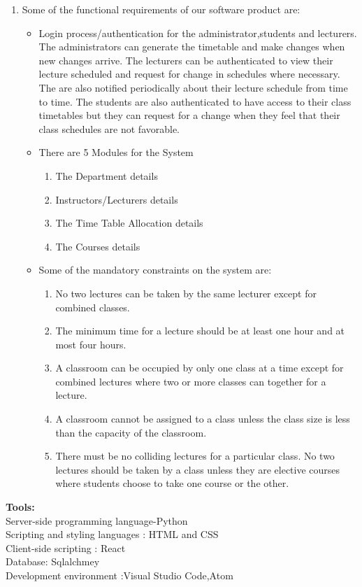 \documentclass{scrreprt}
\begin{document}
\begin{enumerate}
\item Some of the functional requirements of our software product are:
\begin{itemize}
\item Login process/authentication for the administrator,students and lecturers. The administrators can generate the timetable and  make changes when new changes arrive. The lecturers can be authenticated to view their lecture scheduled and request for change in schedules where necessary. The are also notified periodically about their lecture schedule from time to time. The students are also authenticated to have access to their class timetables but they can request for a change when they feel that their class schedules are not favorable.
\item There are 5 Modules for the System
\begin{enumerate}
\item The  Department details 
\item Instructors/Lecturers details
\item The Time Table Allocation details
\item The Courses details
\end{enumerate}
\item Some of the mandatory constraints on the system are:
\begin {enumerate}
\item No two lectures can be taken by the same lecturer except for combined classes.
\item The minimum time for a lecture should be at least one hour and at most four hours.
\item A classroom can be occupied by only one class at a time except  for  combined lectures  where two or more classes can together for a  lecture.
\item A classroom cannot be assigned to a class unless the class size is  less than the capacity of the classroom.
\item There must be no colliding lectures for a particular class. No two lectures should be taken by a class unless they are elective courses where students choose to take one course or the other.
\end {enumerate}
\end {itemize}
\end{enumerate}
\textbf{Tools:}\\
Server-side programming language-Python\\
Scripting  and styling languages : HTML and CSS\\
Client-side scripting : React \\
Database: Sqlalchmey\\
Development environment :Visual Studio Code,Atom
\end{document}
